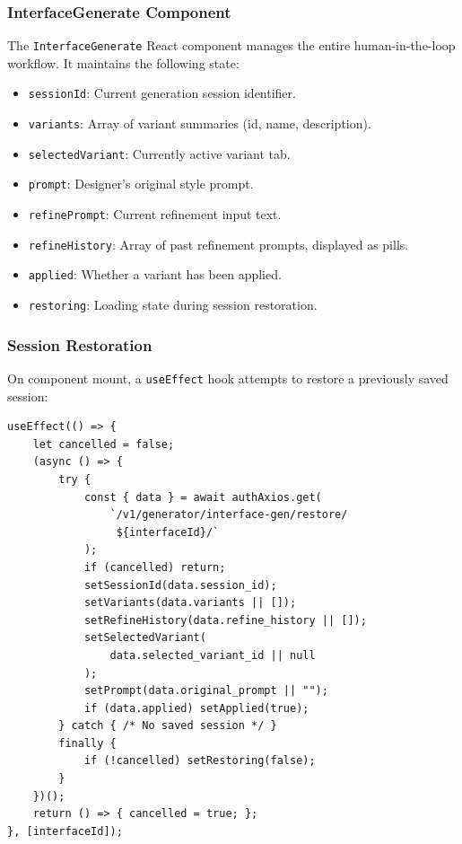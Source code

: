 \subsubsection{InterfaceGenerate Component}

The \texttt{InterfaceGenerate} React component manages the entire human-in-the-loop workflow. It maintains the following state:

\begin{itemize}
    \item \texttt{sessionId}: Current generation session identifier.
    \item \texttt{variants}: Array of variant summaries (id, name, description).
    \item \texttt{selectedVariant}: Currently active variant tab.
    \item \texttt{prompt}: Designer's original style prompt.
    \item \texttt{refinePrompt}: Current refinement input text.
    \item \texttt{refineHistory}: Array of past refinement prompts, displayed as pills.
    \item \texttt{applied}: Whether a variant has been applied.
    \item \texttt{restoring}: Loading state during session restoration.
\end{itemize}

\subsubsection{Session Restoration}

On component mount, a \texttt{useEffect} hook attempts to restore a previously saved session:

\begin{verbatim}
useEffect(() => {
    let cancelled = false;
    (async () => {
        try {
            const { data } = await authAxios.get(
                `/v1/generator/interface-gen/restore/
                 ${interfaceId}/`
            );
            if (cancelled) return;
            setSessionId(data.session_id);
            setVariants(data.variants || []);
            setRefineHistory(data.refine_history || []);
            setSelectedVariant(
                data.selected_variant_id || null
            );
            setPrompt(data.original_prompt || "");
            if (data.applied) setApplied(true);
        } catch { /* No saved session */ }
        finally {
            if (!cancelled) setRestoring(false);
        }
    })();
    return () => { cancelled = true; };
}, [interfaceId]);
\end{verbatim}

